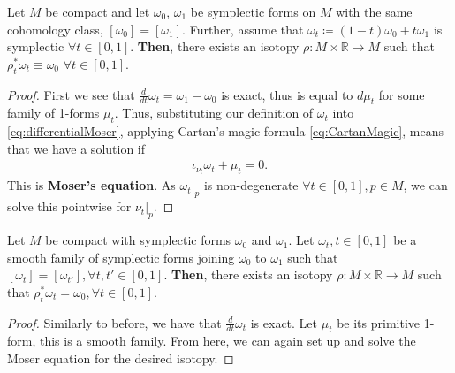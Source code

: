 \documentclass[11pt, final]{article}
\begin{document}
\begin{theorem}
	Let $M$ be compact and let $\omega_0$, $\omega_1$ be symplectic forms on $M$ with the same cohomology class, $[\omega_0] = [\omega_1]$. Further, assume that $\omega_t \coloneqq (1-t) \omega_0 + t \omega_1$ is symplectic $\forall t \in [0,1]$. \textbf{Then}, there exists an isotopy $\rho : M \times \mathbb{R} \to M$ such that $\rho^*_t \omega_t \equiv \omega_0$ $\forall t \in [0,1]$.
\end{theorem}
\begin{proof}
	First we see that $\tfrac{d}{dt}\omega_t = \omega_1 - \omega_0$ is exact, thus is equal to $d \mu_t$ for some family of 1-forms $\mu_t$. Thus, substituting our definition of $\omega_t$ into \eqref{eq:differentialMoser}, applying Cartan's magic formula \eqref{eq:CartanMagic}, means that we have a solution if
		\begin{align}
			\iota_{\nu_t} \omega_t + \mu_t = 0.
		\end{align}
	This is \textbf{Moser's equation}. As $\omega_t|_p$ is non-degenerate $\forall t \in [0,1], p \in M$, we can solve this pointwise for $\nu_t|_p$.
\end{proof}

\begin{theorem}
	Let $M$ be compact with symplectic forms $\omega_0$ and $\omega_1$. Let $\omega_t, t\in [0,1]$ be a smooth family of symplectic forms joining $\omega_0$ to $\omega_1$ such that $[\omega_t] = [\omega_{t'}], \forall t,t' \in [0,1]$.	\textbf{Then}, there exists an isotopy $\rho: M\times\mathbb{R} \to M$ such that $\rho^*_t \omega_t = \omega_0, \forall t \in [0,1]$.
\end{theorem}

\begin{proof}
	Similarly to before, we have that $\tfrac{d}{dt} \omega_t$ is exact. Let $\mu_t$ be its primitive 1-form, this is a smooth family. From here, we can again set up and solve the Moser equation for the desired isotopy.
\end{proof}
\end{document}
